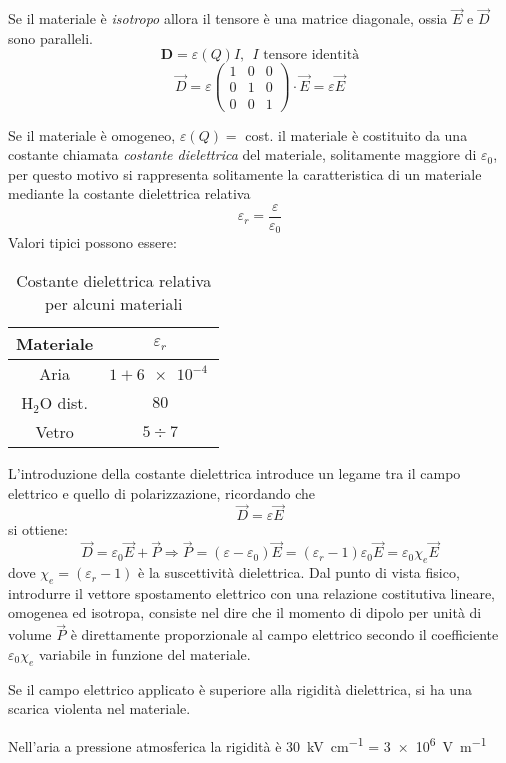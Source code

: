 Se il materiale è \textit{isotropo} allora il tensore è una matrice
diagonale, ossia $\vec{E}$ e $\vec{D}$ sono paralleli.
$$
\mathbf{D} = \varepsilon(Q)I,\ \ I\text{ tensore identità}
$$
$$
\vec{D} = \varepsilon \begin{pmatrix}
                       1 & 0 & 0 \\
                       0 & 1 & 0 \\
                       0 & 0 & 1
                      \end{pmatrix} \cdot \vec{E} = \varepsilon\vec{E}
$$

Se il materiale è omogeneo, $\varepsilon(Q) = $ cost. il materiale
è costituito da una costante chiamata \textit{costante dielettrica}
del materiale, solitamente maggiore di $\varepsilon_0$, per questo
motivo si rappresenta solitamente la caratteristica di un materiale
mediante la costante dielettrica relativa
$$
\varepsilon_r = \frac{\varepsilon}{\varepsilon_0}
$$
\newpage
Valori tipici possono essere:

\begin{table}[H]
\centering
\begin{tabular}[]{c|c}
 Materiale & $\varepsilon_r$ \\ \hline
 Aria & $1 + \SI{6e-4}{}$ \\
 $\text{H}_2\text{O}$ dist. & $80$ \\
 Vetro & $5\div7$
 \end{tabular}
 \caption{Costante dielettrica relativa per alcuni materiali}
\end{table}

L'introduzione della costante dielettrica introduce un legame tra il 
campo elettrico e quello di polarizzazione, ricordando che
$$
\vec{D} = \varepsilon \vec{E}
$$
si ottiene:
$$
\vec{D} = \varepsilon_0\vec{E} + \vec{P} \Rightarrow \vec{P} 
= (\varepsilon-\varepsilon_0)\vec{E} = (\varepsilon_r-1)\varepsilon_0 \vec{E} = \varepsilon_0\chi_e\vec{E}
$$
dove $\chi_e = (\varepsilon_r -1)$ è la suscettività dielettrica.
Dal punto di vista fisico, introdurre il vettore spostamento
elettrico con una relazione costitutiva lineare, omogenea ed 
isotropa, consiste nel dire che il momento di dipolo per unità di 
volume $\vec{P}$ è direttamente proporzionale al campo elettrico
secondo il coefficiente $\varepsilon_0\chi_e$ variabile in funzione
del materiale.

Se il campo elettrico applicato è superiore alla rigidità 
dielettrica, si ha una scarica violenta nel materiale.

Nell'aria a pressione atmosferica la rigidità è \SI{30}{\kilo\volt\per\centi\meter} = \SI{3e6}{\volt\per\meter}

